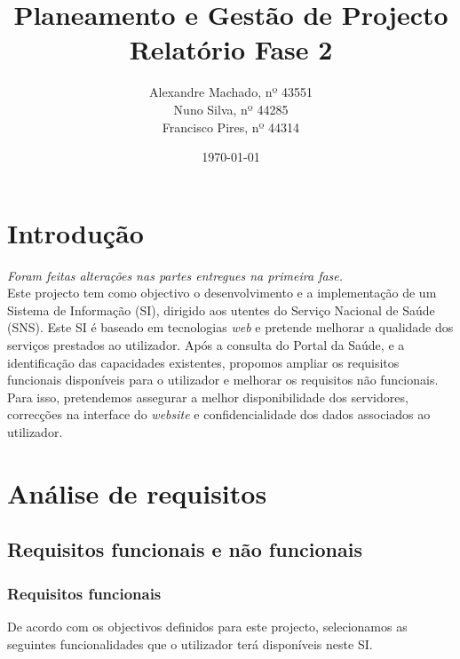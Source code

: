\documentclass[12pt, a4paper, twoside]{report} %
\begin{document}
\title{%
	\textbf{Planeamento e Gestão de Projecto}\\ 
	\large Relatório Fase 2
}

\author{%
Alexandre Machado, nº 43551 \\
Nuno Silva, nº 44285 \\
Francisco Pires, nº 44314 \\
}

\date{\today}
\maketitle
\tableofcontents

\chapter{Introdução}

\textit{Foram feitas alterações nas partes entregues na primeira fase.} \\


Este projecto tem como objectivo o desenvolvimento e a implementação de um Sistema de Informação (SI), dirigido aos utentes do Serviço Nacional de Saúde (SNS). 
Este SI é baseado em tecnologias \textit{web} e pretende melhorar a qualidade dos serviços prestados ao utilizador. 
Após a consulta do Portal da Saúde, e a identificação das capacidades existentes, propomos ampliar os requisitos funcionais disponíveis para o utilizador e melhorar os requisitos não funcionais. 
Para isso, pretendemos assegurar a melhor disponibilidade dos servidores, correcções na interface do \textit{website} e confidencialidade dos dados associados ao utilizador.

\chapter{Análise de requisitos}

\section{Requisitos funcionais e não funcionais}

\subsection{Requisitos funcionais}

De acordo com os objectivos definidos para este projecto, selecionamos as seguintes funcionalidades que o utilizador terá disponíveis neste SI.
\end{document}
